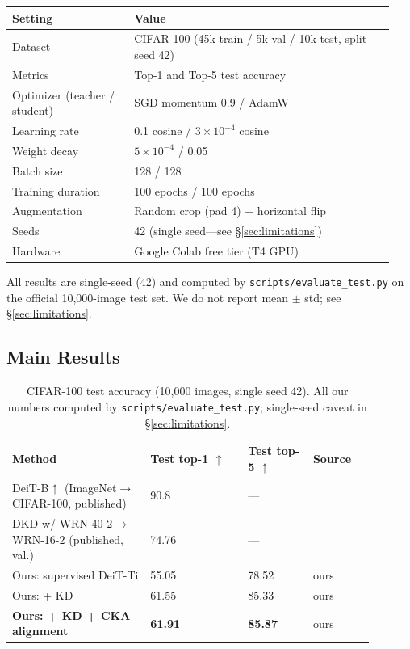 \documentclass[11pt, letterpaper]{article}
\begin{document}
\begin{center}
\begin{tabular}{@{}p{0.30\linewidth}p{0.64\linewidth}@{}}
\toprule
\textbf{Setting} & \textbf{Value} \\
\midrule
Dataset & CIFAR-100 (45k train / 5k val / 10k test, split seed 42) \\
Metrics & Top-1 and Top-5 test accuracy \\
Optimizer (teacher / student) & SGD momentum 0.9 / AdamW \\
Learning rate & 0.1 cosine / $3\times10^{-4}$ cosine \\
Weight decay & $5\times10^{-4}$ / 0.05 \\
Batch size & 128 / 128 \\
Training duration & 100 epochs / 100 epochs \\
Augmentation & Random crop (pad 4) + horizontal flip \\
Seeds & 42 (single seed---see \S\ref{sec:limitations}) \\
Hardware & Google Colab free tier (T4 GPU) \\
\bottomrule
\end{tabular}
\end{center}

All results are single-seed (42) and
computed by \texttt{scripts/\allowbreak{}evaluate\_test.py} on the official 10{,}000-image
test set. We do not report mean $\pm$ std; see \S\ref{sec:limitations}.

\subsection{Main Results}

\begin{table}[htbp]
\centering
\begin{tabular}{@{}p{0.34\linewidth}p{0.24\linewidth}p{0.16\linewidth}p{0.15\linewidth}@{}}
\toprule
\textbf{Method} & \textbf{Test top-1} $\uparrow$ & \textbf{Test top-5} $\uparrow$ & \textbf{Source} \\
\midrule
DeiT-B$\uparrow$ (ImageNet$\to$CIFAR-100, published) & 90.8 & --- & \cite{touvron2021} \\
DKD w/ WRN-40-2$\to$WRN-16-2 (published, val.) & 74.76 & --- & \cite{zhao2022dkd} \\
\midrule
Ours: supervised DeiT-Ti & 55.05 & 78.52 & ours \\
Ours: + KD & 61.55 & 85.33 & ours \\
\textbf{Ours: + KD + CKA alignment} & \textbf{61.91} & \textbf{85.87} & ours \\
\bottomrule
\end{tabular}
\caption{CIFAR-100 test accuracy (10{,}000 images, single seed 42). All our
numbers computed by \texttt{scripts/\allowbreak{}evaluate\_test.py}; single-seed caveat in
\S\ref{sec:limitations}.}
\label{tab:main}
\end{table}
\end{document}
